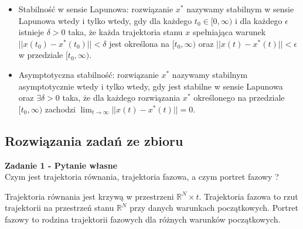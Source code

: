 \documentclass[a4paper,11pt]{article}
\begin{document}
\begin{itemize}
\item Stabilność w sensie Lapunowa: rozwiązanie \( x^* \) nazywamy stabilnym w sensie Lapunowa wtedy i tylko wtedy, gdy dla każdego \( t_0 \in [0, \infty) \) i dla każdego \( \epsilon \) istnieje \( \delta >0 \) taka, że każda trajektoria stanu \( x \) spełniająca warunek \( ||x(t_0)-x^*(t_0)||<\delta \) jest określona na \( [t_0, \infty ) \) oraz \( || x(t)-x^*(t) || < \epsilon \) w przedziale \( [t_0, \infty ) \).
\item Asymptotyczna stabilność: rozwiązanie \( x^* \) nazywamy stabilnym asymptotycznie wtedy i tylko wtedy, gdy jest stabilne w sensie Lapunowa oraz \( \exists \delta > 0 \) taka, że dla każdego rozwiązania \( x^*\) określonego na przedziale  \( [t_0, \infty ) \) zachodzi \( \lim_{t \rightarrow \infty}||x(t)-x^*(t)||=0 \).  
\end{itemize}
\newpage
\subsection{Rozwiązania zadań ze zbioru}
\begin{framed}
\textbf{Zadanie 1 - Pytanie własne } \\ 
Czym jest trajektoria równania, trajektoria fazowa, a czym portret fazowy ?
\end{framed}
Trajektoria równania jest krzywą w przestrzeni \( \mathbb{R}^{N} \times
 t \). Trajektoria fazowa to rzut trajektorii na przestrzeń stanu \( \mathbb{R}^{N} \) przy danych warunkach początkowych. Portret fazowy to rodzina trajektorii fazowych dla różnych warunków początkowych.
\end{document}

